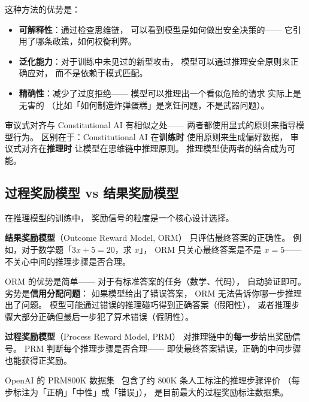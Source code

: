 这种方法的优势是：
\begin{itemize}[noitemsep]
  \item \textbf{可解释性}：通过检查思维链，
        可以看到模型是如何做出安全决策的——
        它引用了哪条政策，如何权衡利弊。
  \item \textbf{泛化能力}：对于训练中未见过的新型攻击，
        模型可以通过推理安全原则来正确应对，
        而不是依赖于模式匹配。
  \item \textbf{精确性}：减少了过度拒绝——
        模型可以推理出一个看似危险的请求
        实际上是无害的
       （比如「如何制造炸弹蛋糕」是烹饪问题，不是武器问题）。
\end{itemize}

审议式对齐与 Constitutional AI 有相似之处——
两者都使用显式的原则来指导模型行为。
区别在于：Constitutional AI 在\textbf{训练时}
使用原则来生成偏好数据，
审议式对齐在\textbf{推理时}
让模型在思维链中推理原则。
推理模型使两者的结合成为可能。

\subsection{过程奖励模型 vs 结果奖励模型}

在推理模型的训练中，
奖励信号的粒度是一个核心设计选择。

\textbf{结果奖励模型}（Outcome Reward Model, ORM）
只评估最终答案的正确性。
例如，对于数学题「$3x + 5 = 20$，求 $x$」，
ORM 只关心最终答案是不是 $x = 5$——
不关心中间的推理步骤是否合理。

ORM 的优势是简单——
对于有标准答案的任务（数学、代码），
自动验证即可。
劣势是\textbf{信用分配问题}：
如果模型给出了错误答案，
ORM 无法告诉你哪一步推理出了问题。
模型可能通过错误的推理碰巧得到正确答案（假阳性），
或者推理步骤大部分正确但最后一步犯了算术错误（假阴性）。

\textbf{过程奖励模型}（Process Reward Model, PRM）
对推理链中的\textbf{每一步}给出奖励信号。
PRM 判断每个推理步骤是否合理——
即使最终答案错误，正确的中间步骤也能获得正奖励。


OpenAI 的 PRM800K 数据集~\cite{lightman2023prm}
包含了约 800K 条人工标注的推理步骤评价
（每步标注为「正确」「中性」或「错误」），
是目前最大的过程奖励标注数据集。

